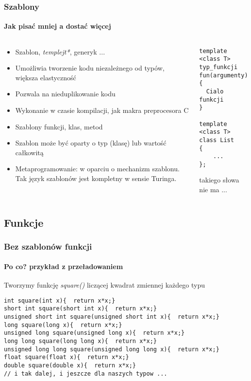 \documentclass[10pt]{beamer}
\begin{document}
\begin{frame}[fragile]
  \frametitle{Szablony}
  \framesubtitle{Jak pisać mniej a dostać więcej}
  \begin{columns}
    \begin{column}{0.6\textwidth}
    \begin{itemize}
      \item Szablon, \textit{templejt*}, generyk ...
      \item Umożliwia tworzenie kodu niezależnego od typów, większa elastyczność
      \item Pozwala na nieduplikowanie kodu
      \item Wykonanie w czasie kompilacji, jak makra preprocesora C
      \item Szablony funkcji, klas, metod
      \item Szablon może być oparty o typ (klasę) lub wartość całkowitą
      \item Metaprogramowanie: w oparciu o mechanizm szablonu. Tak język szablonów jest kompletny w sensie Turinga.
    \end{itemize}
    \end{column}
    \begin{column}{0.47\textwidth}
\begin{lstlisting}
template <class T> 
typ_funkcji fun(argumenty)
{
  Cialo funkcji
}

template <class T> 
class List
{
    ...
};
\end{lstlisting}
{\tiny *takiego słowa nie ma ...}
    \end{column}
  \end{columns}
\end{frame}

\subsection{Funkcje}

\begin{frame}[fragile]
  \frametitle{Bez szablonów funkcji}
  \framesubtitle{Po co? przykład z przeładowaniem}

Tworzymy funkcję \textit{square()} liczącej kwadrat zmiennej każdego typu\\
\vspace{0.1cm}
\begin{lstlisting}
int square(int x){  return x*x;}
short int square(short int x){  return x*x;}
unsigned short int square(unsigned short int x){  return x*x;}
long square(long x){  return x*x;}
unsigned long square(unsigned long x){  return x*x;}
long long square(long long x){  return x*x;}
unsigned long long square(unsigned long long x){  return x*x;}
float square(float x){  return x*x;}
double square(double x){  return x*x;}
// i tak dalej, i jeszcze dla naszych typow ...
\end{lstlisting}

\end{frame}
\end{document}
